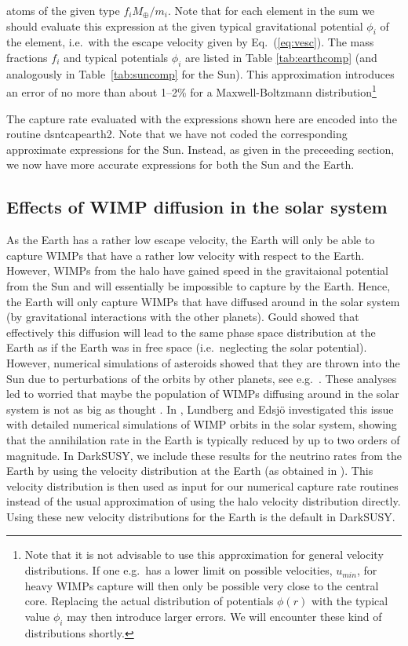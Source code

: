 \documentclass[a4paper,10pt,oneside]{book}
\newcommand{\code}[1]{\ft{#1}}
\newcommand{\ds}{{\sffamily DarkSUSY}}
\newcommand{\ft}[1]{\textsf{#1}}
\begin{document}
atoms of the given type $f_i M_\oplus/m_i$. Note that for each element
in the sum we should evaluate this expression at the given typical
gravitational potential $\phi_i$ of the element, i.e.\ with the escape
velocity given by Eq.~(\ref{eq:vesc}). The mass fractions $f_i$ and
typical potentials $\phi_i$ are listed in Table
\ref{tab:earthcomp} (and analogously in Table~\ref{tab:suncomp} for
the Sun). This approximation introduces an error of no more
than about 1--2\% for a Maxwell-Boltzmann distribution\footnote{Note
  that it is not advisable to use this approximation for general
  velocity distributions. If one e.g.\ has a lower limit on possible
  velocities, $u_{min}$, for heavy WIMPs capture will then only be
  possible very close to the central core. Replacing the actual
  distribution of potentials $\phi(r)$ with the typical value $\phi_i$
  may then introduce larger errors. We will encounter these kind of
  distributions shortly.} 

The capture rate evaluated with the expressions shown here are encoded
into the routine \code{dsntcapearth2}. Note that we have not coded the
corresponding approximate expressions for the Sun. Instead, as given
in the preceeding section, we now have more accurate expressions for
both the Sun and the Earth.

\subsection{Effects of WIMP diffusion in the solar system}

As the Earth has a rather low escape velocity, the Earth will only be
able to capture WIMPs that have a rather low velocity with respect to
the Earth. However, WIMPs from the halo have gained speed in the
gravitaional potential from the Sun and will essentially be impossible
to capture by the Earth. Hence, the Earth will only capture WIMPs that
have diffused around in the solar system (by gravitational
interactions with the other planets). Gould showed \cite{Gould:1991aa}
that effectively this diffusion will lead to the same phase space
distribution at the Earth as if the Earth was in free space
(i.e.\ neglecting the solar potential). However, numerical simulations
of asteroids showed that they are thrown into the Sun due to
perturbations of the orbits by other planets, see
e.g.\ \cite{Farinella:1994aa}. These analyses led to worried that maybe the
population of WIMPs diffusing around in the solar system is not as big
as thought \cite{Gould:1999je}. In \cite{Lundberg:2004dn}, Lundberg and
Edsj\"o investigated this issue with detailed numerical simulations of
WIMP orbits in the solar system, showing that the annihilation rate in
the Earth is typically reduced by up to two orders of magnitude. In
\ds, we include these results for the neutrino rates from the Earth by
using the velocity distribution at the Earth (as obtained in
\cite{Lundberg:2004dn}). This velocity distribution is then used as input
for our numerical capture rate routines instead of the usual
approximation of using the halo velocity distribution directly. Using
these new velocity distributions for the Earth is the default in \ds.
\end{document}
